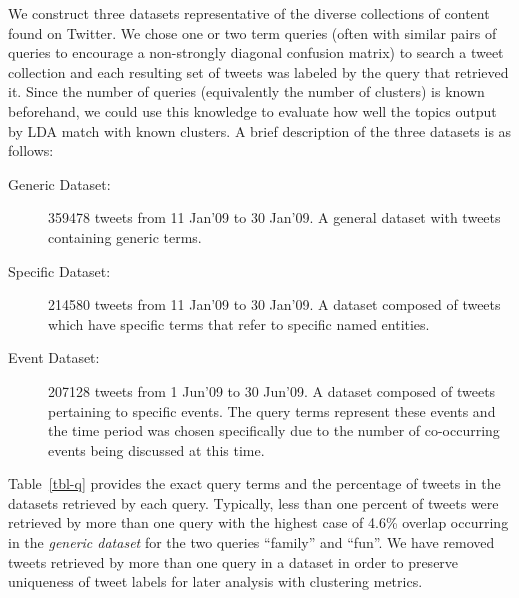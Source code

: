 \documentclass{sig-alternate}
\begin{document}
We construct three datasets representative of the diverse collections
of content found on Twitter.  We chose one or two term queries (often
with similar pairs of queries to encourage a non-strongly diagonal
confusion matrix) to search a tweet collection and each resulting set
of tweets was labeled by the query that retrieved it.  Since the
number of queries (equivalently the number of clusters) is known
beforehand, we could use this knowledge to evaluate how well the
topics output by LDA match with known clusters. A brief description of
the three datasets is as follows:

\begin{description}
\item[Generic Dataset: ] 359478 tweets from 11 Jan'09 to 30 Jan'09.  A
  general dataset with tweets containing generic terms.\vspace{-5pt}
\item[Specific Dataset: ] 214580 tweets from 11 Jan'09 to 30 Jan'09.
  A dataset composed of tweets which have specific terms that refer to
  specific named entities.\vspace{-5pt}
\item[Event Dataset: ] 207128 tweets from 1 Jun'09 to 30 Jun'09.  A
  dataset composed of tweets pertaining to specific events.  The query
  terms represent these events and the time period was chosen
  specifically due to the number of co-occurring events being
  discussed at this time.
\end{description}

Table~\ref{tbl-q} provides the exact query terms and the percentage of
tweets in the datasets retrieved by each query.  Typically, less than
one percent of tweets were retrieved by more than one query with the
highest case of 4.6\% overlap occurring in the \emph{generic dataset}
for the two queries ``family'' and ``fun''.  We have removed tweets
retrieved by more than one query in a dataset in order to preserve
uniqueness of tweet labels for later analysis with clustering metrics.
\end{document}
